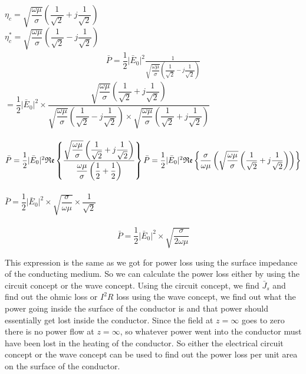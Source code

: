 $\eta_{c}=\sqrt{\dfrac{\omega\mu}{\sigma}}(\dfrac{1}{\sqrt{2}}+j\dfrac{1}{\sqrt{2}})$\\
$\eta_{c}^{\ast}=\sqrt{\dfrac{\omega\mu}{\sigma}}(\dfrac{1}{\sqrt{2}}-j\dfrac{1}{\sqrt{2}})$\\
\begin{align}
\bar{P}=\dfrac{1}{2}\lvert\bar{E}_{0}\rvert^{2}{\frac{1}{\sqrt{\dfrac{\omega\mu}{\sigma}}(\dfrac{1}{\sqrt{2}}-j\dfrac{1}{\sqrt{2}})}} 
\end{align}
$=\dfrac{1}{2}\lvert\bar{E}_{0}\rvert^{2}\times \dfrac{\sqrt{\dfrac{\omega\mu}{\sigma}}(\dfrac{1}{\sqrt{2}}+j\dfrac{1}{\sqrt{2}})}{\sqrt{\dfrac{\omega\mu}{\sigma}}(\dfrac{1}{\sqrt{2}}-j\dfrac{1}{\sqrt{2}})\times \sqrt{\dfrac{\omega\mu}{\sigma}}(\dfrac{1}{\sqrt{2}}+j\dfrac{1}{\sqrt{2}})}$\\\\
$\bar{P}=\dfrac{1}{2}\lvert\bar{E}_{0}\rvert^{2}\mathfrak{Re}\left\lbrace\dfrac{\sqrt{\dfrac{\omega\mu}{\sigma}}\left(\dfrac{1}{\sqrt{2}}+j\dfrac{1}{\sqrt{2}}\right)}{\dfrac{\omega\mu}{\sigma}\left(\dfrac{1}{2}+\dfrac{1}{2}\right)}\right\rbrace\\\\
\bar{P}=\dfrac{1}{2}\lvert\bar{E}_{0}\rvert^{2}\mathfrak{Re}\left\lbrace\dfrac{\sigma}{\omega\mu}\left(\sqrt{\dfrac{\omega\mu}{\sigma}}\left(\dfrac{1}{\sqrt{2}}+j\dfrac{1}{\sqrt{2}}\right)\right)\right\rbrace$\\\\
$\bar{P}=\dfrac{1}{2}\lvert\bar{E}_{0}\rvert^{2}\times \sqrt{\dfrac{\sigma}{\omega\mu}}\times \dfrac{1}{\sqrt{2}}$\\\\
\begin{equation}
\bar{P}=\dfrac{1}{2}\lvert\bar{E}_{0}\rvert^{2}\times \sqrt{\dfrac{\sigma}{2\omega\mu}}
\end{equation}

This expression is the same as we got for power loss using the surface impedance of the conducting medium. So we can calculate the power loss either by using the circuit concept or the wave concept. Using the circuit concept, we find $\bar{J}$$_{s}$ and find out the ohmic loss or $I^{2}R$ loss using the wave concept, we find out what the power going inside the surface of the conductor is and that power should essentially get lost inside the conductor. Since the field at $z=\infty$ goes to zero there is no power flow at $z=\infty$, so whatever power went into the conductor must have been lost in the heating of the conductor. So either the electrical circuit concept or the wave concept can be used to find out the power loss per unit area on the surface of the conductor.

